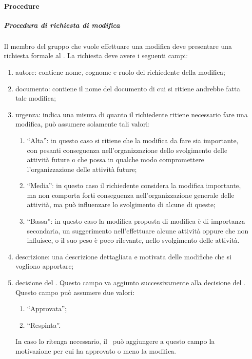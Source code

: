 \documentclass[../NormeProgetto.text]{subfiles}
\begin{document}
		\paragraph{Procedure}
			\subparagraph{Procedura di richiesta di modifica}
				Il membro del gruppo che vuole effettuare una modifica deve presentare una richiesta formale al \responsabilediprogetto. La richiesta deve avere i seguenti campi:
				\begin{enumerate}
					\item autore: contiene nome, cognome e ruolo del richiedente della modifica;
					\item documento: contiene il nome del documento di cui si ritiene andrebbe fatta tale modifica;
					\item urgenza: indica una misura di quanto il richiedente ritiene necessario fare una modifica, può assumere solamente tali valori:
						\begin{enumerate}
							\item ``Alta'': in questo caso si ritiene che la modifica da fare sia importante, con pesanti conseguenza nell'organizzazione dello svolgimento delle attività future o che possa in qualche modo compromettere l'organizzazione delle attività future;
							\item ``Media'': in questo caso il richiedente considera la modifica importante, ma non comporta forti conseguenza nell'organizzazione generale delle attività, ma può influenzare lo svolgimento di alcune di queste;
							\item ``Bassa'': in questo caso la modifica proposta di modifica è di importanza secondaria, un suggerimento nell'effettuare alcune attività oppure che non influisce, o il suo peso è poco rilevante, nello svolgimento delle attività.
						\end{enumerate}
					\item descrizione: una descrizione dettagliata e motivata delle modifiche che si vogliono apportare;
					\item decisione del \responsabilediprogetto. Questo campo va aggiunto successivamente alla decisione del \responsabilediprogetto. Questo campo può assumere due valori:
						\begin{enumerate}
							\item ``Approvata'';
							\item ``Respinta''.
						\end{enumerate}
					In caso lo ritenga necessario, il \responsabilediprogetto\ può aggiungere a questo campo la motivazione per cui ha approvato o meno la modifica.
				\end{enumerate}
\end{document}
